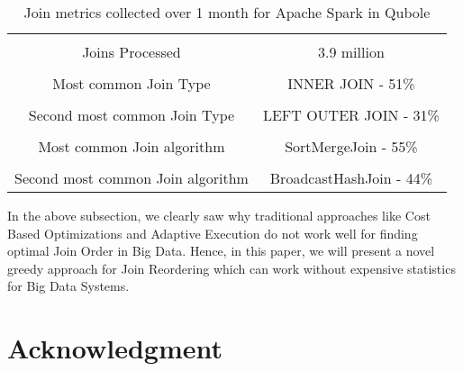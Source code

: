 \documentclass[conference]{IEEEtran}
\begin{document}
\begin{table}[h]
\begin{center}
\begin{tabular}{ |c|c| }
 \hline \\
Joins Processed & 3.9 million \\ \hline \\
Most common Join Type & INNER JOIN - 51\%  \\  \hline \\
Second most common Join Type &  LEFT OUTER JOIN - 31\%\\ \hline  \\
Most common Join algorithm & SortMergeJoin - 55\%\\ \hline \\
Second most common Join algorithm & BroadcastHashJoin - 44\%\\
 \hline
\end{tabular}
\label{tab:stats}
\end{center}
\caption{Join metrics collected over 1 month for Apache Spark in Qubole}
\end{table}




In the above subsection, we clearly saw why traditional approaches like Cost Based Optimizations and Adaptive Execution do not work well for finding optimal Join Order in Big Data. Hence, in this paper, we will present a novel greedy approach for Join Reordering which can work without expensive statistics for Big Data Systems.




\section*{Acknowledgment}
\end{document}
